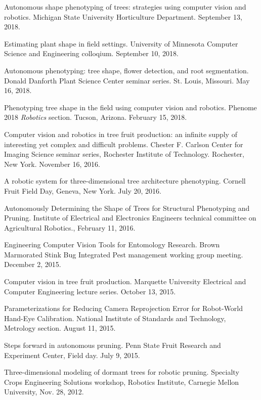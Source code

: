 \documentclass[letterpaper,11pt]{article}
\begin{document}
\begin{enumerate}[leftmargin=*,label={[T\arabic*]}]
\item{Autonomous shape phenotyping of trees: strategies using computer vision and robotics. Michigan State University Horticulture Department. September 13, 2018.}

\item{Estimating plant shape in field settings. University of Minnesota Computer Science and Engineering colloqium. September 10, 2018.}

\item{Autonomous phenotyping: tree shape, flower detection, and root segmentation. Donald Danforth Plant Science Center seminar series.  St. Louis, Missouri.  May 16, 2018.}

\item{ Phenotyping tree shape in the field using computer vision and robotics.  Phenome 2018 {\it Robotics} section. Tucson, Arizona.  February 15, 2018. }

\item{ Computer vision and robotics in tree fruit production: an infinite supply of interesting yet complex and difficult problems. Chester F. Carlson Center for Imaging Science seminar series, Rochester Institute of Technology.  Rochester, New York.  November 16, 2016.}

\item{ A robotic system for three-dimensional tree architecture phenotyping.  Cornell Fruit Field Day, Geneva, New York.  July 20, 2016.}

\item{ Autonomously Determining the Shape of Trees for Structural Phenotyping and Pruning. Institute of Electrical and Electronics Engineers technical committee on Agricultural Robotics., February 11, 2016.} 

\item{ Engineering Computer Vision Tools for Entomology Research.  Brown Marmorated Stink Bug Integrated Pest management working group meeting. December 2, 2015.}

\item{ Computer vision in tree fruit production.  Marquette University Electrical and Computer Engineering lecture series.  October 13, 2015.}

\item{ Parameterizations for Reducing Camera Reprojection Error for Robot-World Hand-Eye Calibration. National Institute of Standards and Technology, Metrology section. August 11, 2015.}

\item{ Steps forward in autonomous pruning.  Penn State Fruit Research and Experiment Center, Field day. July 9, 2015.}

\item{ Three-dimensional modeling of dormant trees for robotic pruning. Specialty Crops Engineering Solutions workshop, Robotics Institute, Carnegie Mellon University, Nov. 28, 2012.}
\end{enumerate}
\end{document}
